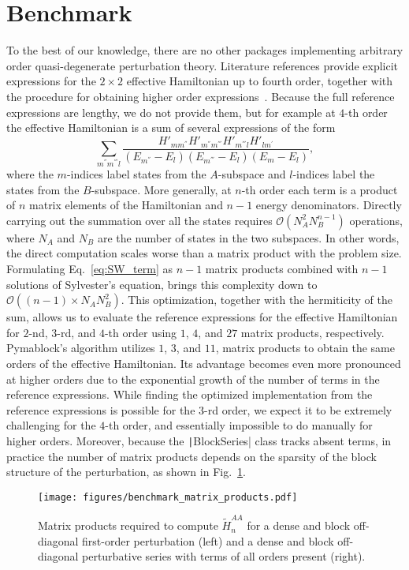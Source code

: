 \section{Benchmark}
\label{sec:benchmark}

To the best of our knowledge, there are no other packages implementing arbitrary order quasi-degenerate perturbation theory.
Literature references provide explicit expressions for the $2 \times 2$ effective Hamiltonian up to fourth order, together with the procedure for obtaining higher order expressions~\cite{Winkler_2003}.
Because the full reference expressions are lengthy, we do not provide them, but for example at $4$-th order the effective Hamiltonian is a sum of several expressions of the form
\begin{equation}
\label{eq:SW_term}
\sum_{m^{''} m^{'''} l}
\frac{H'_{mm^{''}}H'_{m^{''}m^{'''}}H'_{m^{'''}l}H'_{lm^{'}}}{(E_{m^{''}}-E_{l})(E_{m^{'''}}-E_{l})(E_{m}-E_{l})},
\end{equation}
where the $m$-indices label states from the $A$-subspace and $l$-indices label the states from the $B$-subspace.
More generally, at $n$-th order each term is a product of $n$ matrix elements of the Hamiltonian and $n-1$ energy denominators.
Directly carrying out the summation over all the states requires $\mathcal{O}(N_A^2 N_B^{n-1})$ operations, where $N_A$ and $N_B$ are the number of states in the two subspaces.
In other words, the direct computation scales worse than a matrix product with the problem size.
Formulating Eq.~\eqref{eq:SW_term} as $n-1$ matrix products combined with $n-1$ solutions
of Sylvester's equation, brings this complexity down to $\mathcal{O}((n-1) \times N_A N_B^2)$.
This optimization, together with the hermiticity of the sum, allows us to evaluate the reference expressions for the effective Hamiltonian for $2$-nd, $3$-rd, and $4$-th order using $1$, $4$, and $27$ matrix products, respectively.
Pymablock's algorithm utilizes $1$, $3$, and $11$, matrix products to obtain the same orders of the effective Hamiltonian.
Its advantage becomes even more pronounced at higher orders due to the exponential growth of the number of terms in the reference expressions.
While finding the optimized implementation from the reference expressions is possible for the $3$-rd order, we expect it to be extremely challenging for the $4$-th order, and essentially impossible to do manually for higher orders.
Moreover, because the \texttt|BlockSeries| class tracks absent terms, in practice the number of matrix products depends on the sparsity of the block structure of the perturbation, as shown in Fig.~\ref{fig:benchmark_matrix_products}.
%
\begin{figure}[h]
    \centering
    \texttt{[image: figures/benchmark\_matrix\_products.pdf]}
    \caption{
        Matrix products required to compute $\tilde{H}^{AA}_{n}$ for
        a dense and block off-diagonal first-order perturbation (left) and a dense and block off-diagonal perturbative series with terms of all orders present (right).
        }
    \label{fig:benchmark_matrix_products}
\end{figure}
%

